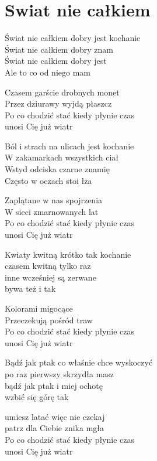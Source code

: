 \section{Swiat nie całkiem}
\begin{text}
Świat nie całkiem dobry jest kochanie\\
Świat nie całkiem dobry znam\\
Świat nie całkiem dobry jest\\
Ale to co od niego mam

Czasem garście drobnych monet\\
Przez dziurawy wyjdą płaszcz\\
Po co chodzić stać kiedy płynie czas\\
unosi Cię już wiatr

Ból i strach na ulicach jest kochanie\\
W zakamarkach wszystkich ciał\\
Wstyd odciska czarne znamię\\
Często w oczach stoi łza

Zaplątane w nas spojrzenia\\
W sieci zmarnowanych lat\\
Po co chodzić stać kiedy płynie czas\\
unosi Cię już wiatr

Kwiaty kwitną krótko tak kochanie\\
czasem kwitną tylko raz\\
inne wcześniej są zerwane\\
bywa też i tak

Kolorami migocące\\
Przeczekują pośród traw\\
Po co chodzić stać kiedy płynie czas\\
unosi Cię już wiatr

Bądź jak ptak co właśnie chce wyskoczyć\\
po raz pierwszy skrzydła masz \\
bądź jak ptak i miej ochotę\\
wzbić się górę tak

umiesz latać więc nie czekaj\\
patrz dla Ciebie znika mgła\\
Po co chodzić stać kiedy płynie czas\\
unosi Cię już wiatr
\end{text}
